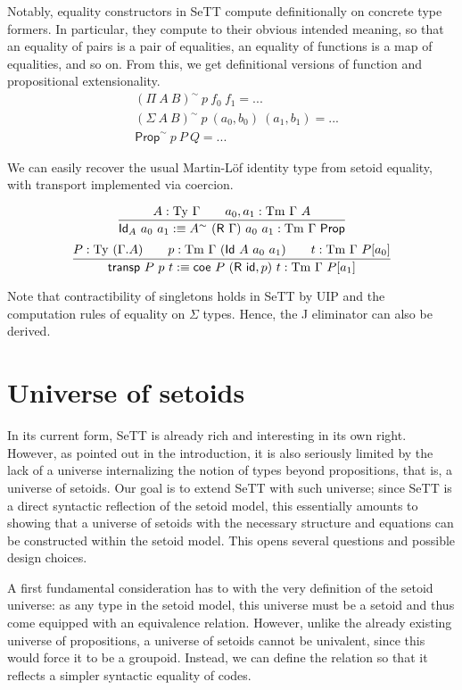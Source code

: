 \documentclass{easychair}
\newcommand{\GG}{\Gamma}
\newcommand{\R}{\textsf{R}}
\newcommand{\Id}{\textsf{Id}}
\newcommand{\coe}{\textsf{coe}}
\newcommand{\tyj}[2]{#2 : \Ty\ #1}
\newcommand{\tmj}[3]{#2 : \Tm\ #1\ #3}
\newcommand{\Prop}{\textsf{Prop}}
\newcommand{\Ty}{\mathrm{Ty}}
\newcommand{\Tm}{\mathrm{Tm}}
\begin{document}
Notably, equality constructors in SeTT compute definitionally on concrete type
formers. In particular, they compute to their obvious intended meaning, so that
an equality of pairs is a pair of equalities, an equality of functions is a map
of equalities, and so on. From this, we get definitional versions of function
and propositional extensionality.
%
\begin{align*}
  & (\Pi\ A\ B)^\sim\ p\ f_0\ f_1 = ... \\
  & (\Sigma\ A\ B)^\sim\ p\ (a_0, b_0)\ (a_1, b_1) = ... \\
  & \Prop^\sim\ p\ P\ Q = ...
\end{align*}

We can easily recover the usual Martin-L\"of identity type from setoid equality,
with transport implemented via coercion.

\[
\infer{
  \textsf{Id}_A\ a_0\ a_1 :\equiv A^{\sim}\ (\R\ \GG)\ a_0\ a_1 : \Tm\ \GG\ \Prop
}{
  \tyj{\GG}{A} \qquad \tmj{\GG}{a_0, a_1}{A}
}
\]
\[
\infer{
  \textsf{transp}\ P\ p\ t :\equiv
    \coe\ P\ (\textsf{R}\ \textsf{id} , p)\ t : \Tm\ \GG\ P[a_1]
}{
  P : \Ty\ (\GG . A)
  \qquad
  p : \Tm\ \GG\ (\Id\ A\ a_0\ a_1)
  \qquad
  t : \Tm\ \GG\ P[a_0]
}
\]

Note that contractibility of singletons holds in SeTT by UIP and the computation
rules of equality on $\Sigma$ types. Hence, the J eliminator can also be
derived.

\section{Universe of setoids}\label{setoid-universe}

In its current form, SeTT is already rich and interesting in its own right.
However, as pointed out in the introduction, it is also seriously limited by the
lack of a universe internalizing the notion of types beyond propositions, that
is, a universe of setoids. Our goal is to extend SeTT with such universe; since
SeTT is a direct syntactic reflection of the setoid model, this essentially
amounts to showing that a universe of setoids with the necessary structure and
equations can be constructed within the setoid model. This opens several
questions and possible design choices.

A first fundamental consideration has to with the very definition of the setoid
universe: as any type in the setoid model, this universe must be a setoid and
thus come equipped with an equivalence relation. However, unlike the already
existing universe of propositions, a universe of setoids cannot be univalent,
since this would force it to be a groupoid. Instead, we can define the relation
so that it reflects a simpler syntactic equality of codes.
\end{document}
